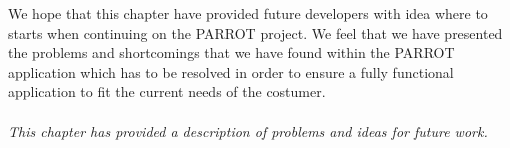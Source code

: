 We hope that this chapter have provided future developers with idea where to starts when continuing on the PARROT project. 
We feel that we have presented the problems and shortcomings that we have found within the PARROT application which has to be resolved in order to ensure a fully functional application to fit the current needs of the costumer.\\
\\
\textit{This chapter has provided a description of problems and ideas for future work.}